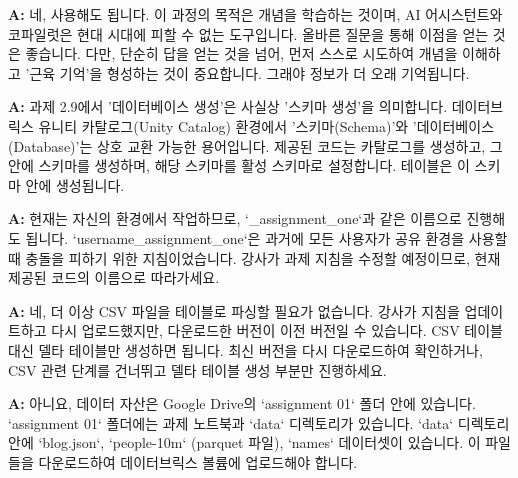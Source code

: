\documentclass[11pt,a4paper]{article}
\begin{document}
\begin{tcolorbox}[mybox, title=Q: 과제에서 AI 어시스턴트(예: Databricks AI Assistant)를 사용해도 되나요?]
\textbf{A:} 네, 사용해도 됩니다. 이 과정의 목적은 개념을 학습하는 것이며, AI 어시스턴트와 코파일럿은 현대 시대에 피할 수 없는 도구입니다. 올바른 질문을 통해 이점을 얻는 것은 좋습니다. 다만, 단순히 답을 얻는 것을 넘어, 먼저 스스로 시도하여 개념을 이해하고 '근육 기억'을 형성하는 것이 중요합니다. 그래야 정보가 더 오래 기억됩니다.
\end{tcolorbox}

\begin{tcolorbox}[mybox, title=Q: 과제 2.9에서 '데이터베이스 생성'이 무엇을 의미하나요? 스키마와 데이터베이스의 차이는 무엇인가요?]
\textbf{A:} 과제 2.9에서 '데이터베이스 생성'은 사실상 '스키마 생성'을 의미합니다. 데이터브릭스 유니티 카탈로그(Unity Catalog) 환경에서 '스키마(Schema)'와 '데이터베이스(Database)'는 상호 교환 가능한 용어입니다. 제공된 코드는 카탈로그를 생성하고, 그 안에 스키마를 생성하며, 해당 스키마를 활성 스키마로 설정합니다. 테이블은 이 스키마 안에 생성됩니다.
\end{tcolorbox}

\begin{tcolorbox}[mybox, title=Q: 과제에서 데이터베이스 이름을 `_assignment_one` 대신 `username_assignment_one`으로 해야 한다고 되어 있는데, 어떻게 해야 하나요?]
\textbf{A:} 현재는 자신의 환경에서 작업하므로, `_assignment_one`과 같은 이름으로 진행해도 됩니다. `username_assignment_one`은 과거에 모든 사용자가 공유 환경을 사용할 때 충돌을 피하기 위한 지침이었습니다. 강사가 과제 지침을 수정할 예정이므로, 현재 제공된 코드의 이름으로 따라가세요.
\end{tcolorbox}

\begin{tcolorbox}[mybox, title=Q: 제 과제 2.9 내용이 강사님이 보여주신 것과 다릅니다. CSV 파일을 테이블로 파싱하라는 내용이 있는데, 더 이상 하지 않나요?]
\textbf{A:} 네, 더 이상 CSV 파일을 테이블로 파싱할 필요가 없습니다. 강사가 지침을 업데이트하고 다시 업로드했지만, 다운로드한 버전이 이전 버전일 수 있습니다. CSV 테이블 대신 델타 테이블만 생성하면 됩니다. 최신 버전을 다시 다운로드하여 확인하거나, CSV 관련 단계를 건너뛰고 델타 테이블 생성 부분만 진행하세요.
\end{tcolorbox}

\begin{tcolorbox}[mybox, title=Q: 데이터 자산(data assets)은 어디서 찾을 수 있나요? 온라인에서 직접 찾아야 하나요?]
\textbf{A:} 아니요, 데이터 자산은 Google Drive의 `assignment 01` 폴더 안에 있습니다. `assignment 01` 폴더에는 과제 노트북과 `data` 디렉토리가 있습니다. `data` 디렉토리 안에 `blog.json`, `people-10m` (parquet 파일), `names` 데이터셋이 있습니다. 이 파일들을 다운로드하여 데이터브릭스 볼륨에 업로드해야 합니다.
\end{tcolorbox}
\end{document}
